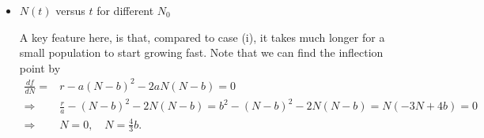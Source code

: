 \documentclass[12pt]{article}
\begin{document}
\begin{ex}
\begin{solution}
\begin{enumerate}[(i)]
\begin{itemize}
    \item $N(t)$ versus $t$ for different $N_0$
    \begin{figure}[h]
      \centering
    \end{figure}
    
    A key feature here, is that, compared to case (i), it takes much longer for a small population to start growing fast. Note that we can find the inflection point by
    \begin{align*}
      \frac{df}{dN}=&r-a(N-b)^2-2aN(N-b)=0\\
      \Rightarrow &\frac{r}{a}-(N-b)^2-2N(N-b)=b^2-(N-b)^2-2N(N-b)=N(-3N+4b)=0\\
      \Rightarrow &N=0,\quad N=\tfrac{4}{3}b.
    \end{align*}
    \end{itemize}
    
  \end{enumerate}
  
\end{solution}
\end{ex}
\end{document}
